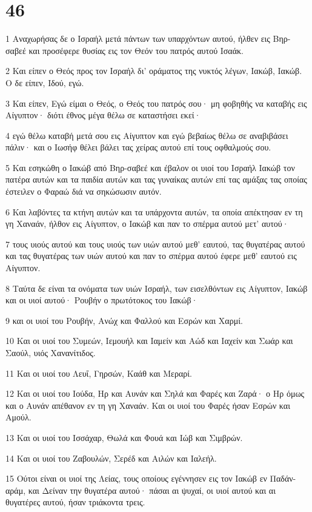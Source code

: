 \chapter{46}

\par 1 Αναχωρήσας δε ο Ισραήλ μετά πάντων των υπαρχόντων αυτού, ήλθεν εις Βηρ-σαβεέ και προσέφερε θυσίας εις τον Θεόν του πατρός αυτού Ισαάκ.
\par 2 Και είπεν ο Θεός προς τον Ισραήλ δι' οράματος της νυκτός λέγων, Ιακώβ, Ιακώβ. Ο δε είπεν, Ιδού, εγώ.
\par 3 Και είπεν, Εγώ είμαι ο Θεός, ο Θεός του πατρός σου· μη φοβηθής να καταβής εις Αίγυπτον· διότι έθνος μέγα θέλω σε καταστήσει εκεί·
\par 4 εγώ θέλω καταβή μετά σου εις Αίγυπτον και εγώ βεβαίως θέλω σε αναβιβάσει πάλιν· και ο Ιωσήφ θέλει βάλει τας χείρας αυτού επί τους οφθαλμούς σου.
\par 5 Και εσηκώθη ο Ιακώβ από Βηρ-σαβεέ και έβαλον οι υιοί του Ισραήλ Ιακώβ τον πατέρα αυτών και τα παιδία αυτών και τας γυναίκας αυτών επί τας αμάξας τας οποίας έστειλεν ο Φαραώ διά να σηκώσωσιν αυτόν.
\par 6 Και λαβόντες τα κτήνη αυτών και τα υπάρχοντα αυτών, τα οποία απέκτησαν εν τη γη Χαναάν, ήλθον εις Αίγυπτον, ο Ιακώβ και παν το σπέρμα αυτού μετ' αυτού·
\par 7 τους υιούς αυτού και τους υιούς των υιών αυτού μεθ' εαυτού, τας θυγατέρας αυτού και τας θυγατέρας των υιών αυτού και παν το σπέρμα αυτού έφερε μεθ' εαυτού εις Αίγυπτον.
\par 8 Ταύτα δε είναι τα ονόματα των υιών Ισραήλ, των εισελθόντων εις Αίγυπτον, Ιακώβ και οι υιοί αυτού· Ρουβήν ο πρωτότοκος του Ιακώβ·
\par 9 και οι υιοί του Ρουβήν, Ανώχ και Φαλλού και Εσρών και Χαρμί.
\par 10 Και οι υιοί του Συμεών, Ιεμουήλ και Ιαμείν και Αώδ και Ιαχείν και Σωάρ και Σαούλ, υιός Χανανίτιδος.
\par 11 Και οι υιοί του Λευΐ, Γηρσών, Καάθ και Μεραρί.
\par 12 Και οι υιοί του Ιούδα, Ηρ και Αυνάν και Σηλά και Φαρές και Ζαρά· ο Ηρ όμως και ο Αυνάν απέθανον εν τη γη Χαναάν. Και οι υιοί του Φαρές ήσαν Εσρών και Αμούλ.
\par 13 Και οι υιοί του Ισσάχαρ, Θωλά και Φουά και Ιώβ και Σιμβρών.
\par 14 Και οι υιοί του Ζαβουλών, Σερέδ και Αιλών και Ιαλεήλ.
\par 15 Ούτοι είναι οι υιοί της Λείας, τους οποίους εγέννησεν εις τον Ιακώβ εν Παδάν-αράμ, και Δείναν την θυγατέρα αυτού· πάσαι αι ψυχαί, οι υιοί αυτού και αι θυγατέρες αυτού, ήσαν τριάκοντα τρεις.
